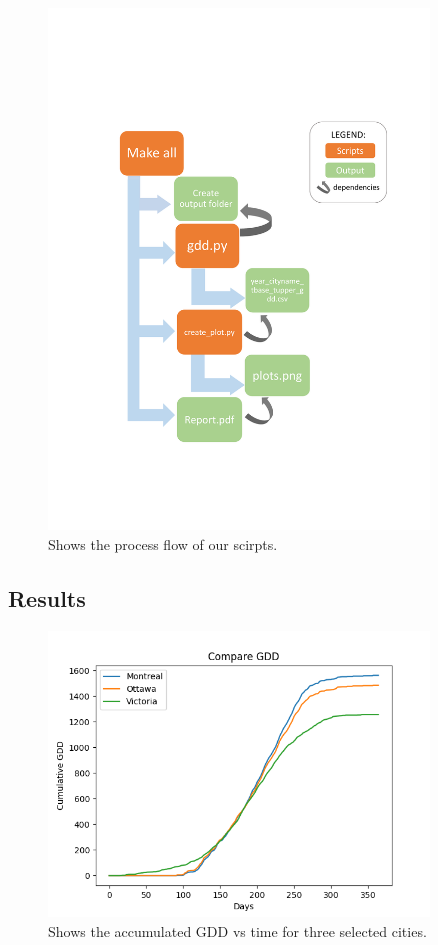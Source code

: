 \documentclass[12pt]{article}
\begin{document}
	\begin{figure}[!htbp]
		\centering
		\includegraphics[width=0.9\textwidth]{./Report/diagram_workflow.pdf} 
		\caption{\scriptsize Shows the process flow of our scirpts.}\label{flowplot}		  
	\end{figure}


\pagebreak
\subsection{Results}
	\begin{figure}[!htbp]
		\centering
		\includegraphics[width=0.9\textwidth]{./Output/CumulativeGDD.png} 
		\caption{\scriptsize Shows the accumulated GDD vs time for three selected cities.}\label{GDDplot}		  
	\end{figure}
\end{document}
